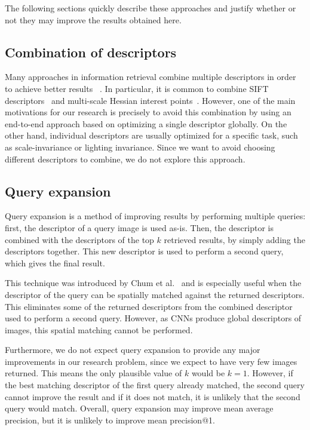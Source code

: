 The following sections quickly describe these approaches and
justify whether or not they may improve the results obtained
here.

\subsection{Combination of descriptors}
Many approaches in information retrieval combine multiple
descriptors in order to achieve better results
~\cite{philbin_lost_2008,jegou_accurate_2010,chum_total_2007}.
In particular,
it is common to combine SIFT descriptors~\cite{lowe_distinctive_2004}
and multi-scale Hessian interest points~\cite{mikolajczyk_scale_2004}.
However, one of the main motivations for our research is precisely to avoid
this combination by using an end-to-end approach based
on optimizing a single descriptor globally. On the other hand,
individual descriptors are usually optimized for
a specific task, such as scale-invariance or lighting invariance.
Since we want to avoid choosing
different descriptors to combine, we do not explore this approach.

\subsection{Query expansion}
Query expansion is a method of improving results by performing
multiple queries: first, the
descriptor of a query image is used as-is. Then, the descriptor
is combined with the descriptors of the top $k$ retrieved
results, by simply adding the descriptors together. This new
descriptor is used to perform a second query, which gives
the final result.

This technique was introduced by
Chum et al.~\cite{chum_total_2007} and is especially useful
when the descriptor of the query can be spatially matched
against the returned descriptors. This eliminates some of the
returned descriptors from the combined descriptor used
to perform a second query. However, as CNNs produce
global descriptors of images, this spatial matching cannot
be performed.

Furthermore, we do not expect query expansion to provide
any major improvements in our research problem, since
we expect to have very few images returned. This means
the only plausible value of $k$ would be $k=1$. However,
if the best matching descriptor of the first query already
matched, the second query cannot improve the result
and if it does not match, it is unlikely that the second
query would match. Overall, query expansion may
improve mean average precision, but it is unlikely to
improve mean precision@1.

